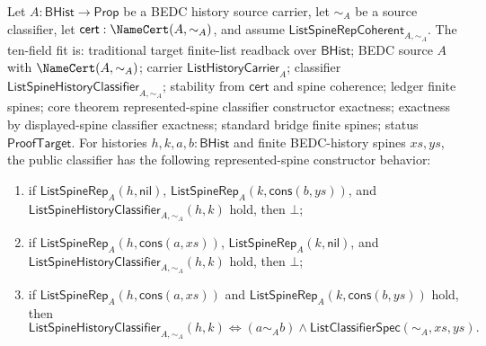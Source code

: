 \begin{theorem}
\label{thm:list-represented-spine-classifier-constructor-exactness}
Let $A:\mathsf{BHist}\to\mathsf{Prop}$ be a BEDC history source carrier, let
$\sim_A$ be a source classifier, let $\mathsf{cert}:\NameCert(A,\sim_A)$, and
assume $\mathsf{ListSpineRepCoherent}_{A,\sim_A}$. The ten-field fit is:
traditional target finite-list readback over $\mathsf{BHist}$; BEDC source $A$
with $\NameCert(A,\sim_A)$; carrier $\mathsf{ListHistoryCarrier}_A$; classifier
$\mathsf{ListSpineHistoryClassifier}_{A,\sim_A}$; stability from
$\mathsf{cert}$ and spine coherence; ledger finite spines; core theorem
represented-spine classifier constructor exactness; exactness by
displayed-spine classifier exactness; standard bridge finite spines; status
$\mathsf{ProofTarget}$. For histories $h,k,a,b:\mathsf{BHist}$ and finite
BEDC-history spines $xs,ys$, the public classifier has the following
represented-spine constructor behavior:
\begin{enumerate}
  \item if $\mathsf{ListSpineRep}_A(h,\mathsf{nil})$,
  $\mathsf{ListSpineRep}_A(k,\mathsf{cons}(b,ys))$, and
  $\mathsf{ListSpineHistoryClassifier}_{A,\sim_A}(h,k)$ hold, then $\bot$;
  \item if $\mathsf{ListSpineRep}_A(h,\mathsf{cons}(a,xs))$,
  $\mathsf{ListSpineRep}_A(k,\mathsf{nil})$, and
  $\mathsf{ListSpineHistoryClassifier}_{A,\sim_A}(h,k)$ hold, then $\bot$;
  \item if $\mathsf{ListSpineRep}_A(h,\mathsf{cons}(a,xs))$ and
  $\mathsf{ListSpineRep}_A(k,\mathsf{cons}(b,ys))$ hold, then
  $$
  \mathsf{ListSpineHistoryClassifier}_{A,\sim_A}(h,k)
  \Longleftrightarrow
  (a\sim_A b)\land \mathsf{ListClassifierSpec}(\sim_A,xs,ys).
  $$
\end{enumerate}
\end{theorem}
